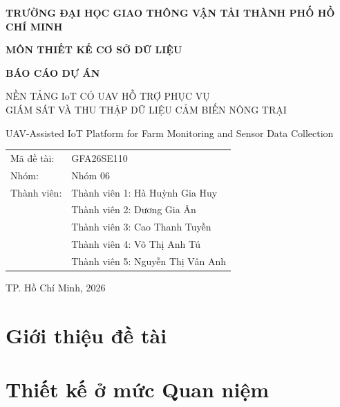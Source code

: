 \documentclass[12pt,a4paper]{article}
\begin{document}
\begin{titlepage}
    \centering
    \vspace{0.5cm}
    {\Large \textbf{TRƯỜNG ĐẠI HỌC GIAO THÔNG VẬN TẢI THÀNH PHỐ HỒ CHÍ MINH}\par}
    \vspace{2cm}
    {\Large \textbf{MÔN THIẾT KẾ CƠ SỞ DỮ LIỆU}\par}
    \vspace{1.5cm}

    {\Huge \textbf{BÁO CÁO DỰ ÁN}\par}
    \vspace{1cm}

    {\Large NỀN TẢNG IoT CÓ UAV HỖ TRỢ PHỤC VỤ\\
    GIÁM SÁT VÀ THU THẬP DỮ LIỆU CẢM BIẾN NÔNG TRẠI\par}

    \vspace{0.7cm}
    {\large UAV-Assisted IoT Platform for Farm Monitoring and Sensor Data Collection\par}

    \vfill

    \begin{tabular}{ll}
        Mã đề tài: & GFA26SE110\\
        Nhóm: & Nhóm 06\\
        Thành viên: & Thành viên 1: Hà Huỳnh Gia Huy\\
                   & Thành viên 2: Dương Gia Ân\\
                   & Thành viên 3: Cao Thanh Tuyền\\
                   & Thành viên 4: Võ Thị Anh Tú\\
                   & Thành viên 5: Nguyễn Thị Vân Anh\\
    \end{tabular}

    \vfill
    {\large TP. Hồ Chí Minh, 2026\par}
\end{titlepage}

\tableofcontents
\newpage

\section{Giới thiệu đề tài}


\section{Thiết kế ở mức Quan niệm}

\end{document}
